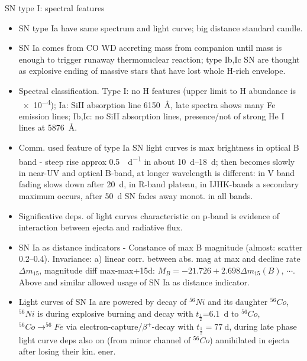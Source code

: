 \begin{frame}{SN type I: spectral features}
    \begin{itemize}
\item SN type Ia have same spectrum and light curve; big distance standard candle.
        \item SN Ia comes from CO WD accreting mass from companion until mass is enough to trigger runaway thermonuclear reaction; type Ib,Ic SN are thought as explosive ending of massive stars that have lost whole H-rich envelope.
        \item Spectral classification. Type I: no H features (upper limit to H abundance is \SI{e-4}{\solarmass}); Ia: SiII absorption line \SI{6150}{\angstrom}, late spectra shows many Fe emission lines; Ib,Ic: no SiII absorption lines, presence/not of strong He I lines at \SI{5876}{\angstrom}.
        \item Comm. used feature of type Ia SN light curves is max brightness in optical B band - steep rise approx \SI{0.5}{\mag\per\day} in about \SIrange{10}{18}{\day}; then becomes slowly in near-UV and optical B-band, at longer wavelength is different: in V band fading slows down after \SI{20}{\day}, in R-band plateau, in IJHK-bands a secondary maximum occurs, after \SI{50}{\day} SN fades away monot. in all bands.
        \item Significative deps. of light curves characteristic on p-band is evidence of interaction between ejecta and radiative flux.
        \item SN Ia as distance indicators - Constance of max B magnitude (almost: scatter \SIrange{0.2}{0.4}{\mag}). Invariance: a) linear corr. between abs. mag at max and decline rate $\Delta m_{15}$, magnitude diff max-max+15d: $M_B=-21.726+2.698\Delta m_{15}(B)$, $\cdots$. Above and similar allowed usage of SN Ia as distance indicator.
    \item Light curves of SN Ia are powered by decay of $^56Ni$ and its daughter $^{56}Co$, $^{56}Ni$ is during explosive burning and decay with $t_{\frac{1}{2}}$=\SI{6.1}{\day} to $^{56}Co$, $^{56}Co\to ^{56}Fe$ via electron-capture/$\beta^+$-decay with $t_{\frac{1}{2}}=\SI{77}{\day}$, during late phase light curve deps also on \APelectron (from minor channel of $^{56}Co$) annihilated in ejecta after losing their kin. ener.
    \end{itemize}
\end{frame}

